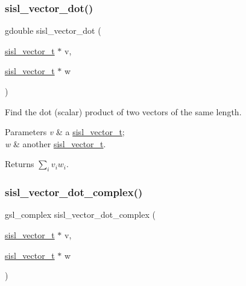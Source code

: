 \subsubsection{\texorpdfstring{sisl\+\_\+vector\+\_\+dot()}{sisl\_vector\_dot()}}
{\footnotesize\ttfamily gdouble sisl\+\_\+vector\+\_\+dot (\begin{DoxyParamCaption}\item[{\mbox{\hyperlink{group__vector_gacbac585492f5005f05f0c0b8463039be}{sisl\+\_\+vector\+\_\+t}} $\ast$}]{v,  }\item[{\mbox{\hyperlink{group__vector_gacbac585492f5005f05f0c0b8463039be}{sisl\+\_\+vector\+\_\+t}} $\ast$}]{w }\end{DoxyParamCaption})}

Find the dot (scalar) product of two vectors of the same length.


\begin{DoxyParams}{Parameters}
{\em v} & a \mbox{\hyperlink{group__vector_gacbac585492f5005f05f0c0b8463039be}{sisl\+\_\+vector\+\_\+t}}; \\
\hline
{\em w} & another \mbox{\hyperlink{group__vector_gacbac585492f5005f05f0c0b8463039be}{sisl\+\_\+vector\+\_\+t}}.\\
\hline
\end{DoxyParams}
\begin{DoxyReturn}{Returns}
$\sum_{i}v_{i}w_{i}$. 
\end{DoxyReturn}
\mbox{\label{group__vector_ga6e86d7ca00a219dc151ea78a6c904014}} 
\subsubsection{\texorpdfstring{sisl\+\_\+vector\+\_\+dot\+\_\+complex()}{sisl\_vector\_dot\_complex()}}
{\footnotesize\ttfamily gsl\+\_\+complex sisl\+\_\+vector\+\_\+dot\+\_\+complex (\begin{DoxyParamCaption}\item[{\mbox{\hyperlink{group__vector_gacbac585492f5005f05f0c0b8463039be}{sisl\+\_\+vector\+\_\+t}} $\ast$}]{v,  }\item[{\mbox{\hyperlink{group__vector_gacbac585492f5005f05f0c0b8463039be}{sisl\+\_\+vector\+\_\+t}} $\ast$}]{w }\end{DoxyParamCaption})}

